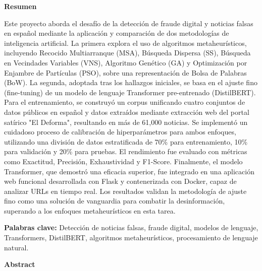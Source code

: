 \thispagestyle{plain}  
\vspace{0.9cm}
\textbf{{\Large Resumen}}
\vspace{0.9cm}

Este proyecto aborda el desafío de la detección de fraude digital y noticias falsas en español mediante la aplicación y comparación de dos metodologías de inteligencia artificial. La primera explora el uso de algoritmos metaheurísticos, incluyendo Recocido Multiarranque (MSA), Búsqueda Dispersa (SS), Búsqueda en Vecindades Variables (VNS), Algoritmo Genético (GA) y Optimización por Enjambre de Partículas (PSO), sobre una representación de Bolsa de Palabras (BoW). La segunda, adoptada tras los hallazgos iniciales, se basa en el ajuste fino (fine-tuning) de un modelo de lenguaje Transformer pre-entrenado (DistilBERT). Para el entrenamiento, se construyó un corpus unificando cuatro conjuntos de datos públicos en español y datos extraídos mediante extracción web del portal satírico "El Deforma", resultando en más de 61,000 noticias. Se implementó un cuidadoso proceso de calibración de hiperparámetros para ambos enfoques, utilizando una división de datos estratificada de 70\% para entrenamiento, 10\% para validación y 20\% para pruebas. El rendimiento fue evaluado con métricas como Exactitud, Precisión, Exhaustividad y F1-Score. Finalmente, el modelo Transformer, que demostró una eficacia superior, fue integrado en una aplicación web funcional desarrollada con Flask y contenerizada con Docker, capaz de analizar URLs en tiempo real. Los resultados validan la metodología de ajuste fino como una solución de vanguardia para combatir la desinformación, superando a los enfoques metaheurísticos en esta tarea.

\vspace{0.9cm}
\textbf{Palabras clave:} Detección de noticias falsas, fraude digital, modelos de lenguaje, Transformers, DistilBERT, algoritmos metaheurísticos, procesamiento de lenguaje natural.

\shipout\null
\newpage

\thispagestyle{plain}  
\vspace{0.9cm}
\textbf{{\Large Abstract}}
\vspace{0.9cm}

